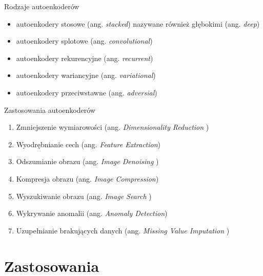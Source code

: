 \documentclass{beamer}
\theoremstyle{plain}
\theoremstyle{definition}
\theoremstyle{remark}
\begin{document}
\begin{frame}{Rodzaje autoenkoderów}
	\begin{itemize}
		\item autoenkodery stosowe (ang. \emph{stacked}) nazywane również głębokimi (ang. \emph{deep})
		\item autoenkodery splotowe (ang. \emph{convolutional})
		\item autoenkodery rekurencyjne (ang. \emph{recurrent})
		\item autoenkodery wariancyjne (ang. \emph{variational})
		\item autoenkodery przeciwstawne (ang. \emph{adversial})
	\end{itemize}
\end{frame}
\begin{frame}{Zastosowania autoenkoderów}
	\begin{enumerate}
		\item  Zmniejszenie wymiarowości (ang. \emph{Dimensionality Reduction })
		
		\item  Wyodrębnianie cech (ang. \emph{Feature Extraction})
		
		\item  Odszumianie obrazu (ang. \emph{Image Denoising })
		
		\item  Kompresja obrazu (ang. \emph{Image Compression})
		
		\item Wyszukiwanie obrazu (ang. \emph{ Image Search })
		
		\item Wykrywanie anomalii (ang. \emph{ Anomaly Detection})
		
		\item  Uzupełnianie brakujących danych (ang. \emph{Missing Value Imputation })
		
	\end{enumerate}
\end{frame}
\section{Zastosowania}
\end{document}
